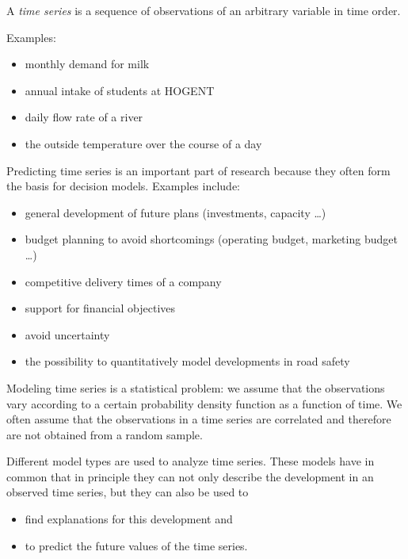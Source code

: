   \begin{definition}
    A \emph{time series} is a sequence of observations of an arbitrary variable in time order.
\end{definition}

Examples:

\begin{itemize}
	\item monthly demand for milk
	\item annual intake of students at HOGENT
	\item daily flow rate of a river
	\item the outside temperature over the course of a day
\end{itemize}

Predicting time series is an important part of research because they often form the basis for decision models. Examples include:

\begin{itemize}
	\item general development of future plans (investments, capacity \dots)
	\item budget planning to avoid shortcomings (operating budget, marketing budget \dots)
	\item competitive delivery times of a company
	\item support for financial objectives
	\item avoid uncertainty
	\item the possibility to quantitatively model developments in road safety
\end{itemize}


Modeling time series is a statistical problem: we assume that the observations vary according to a certain probability density function as a function of time. We often assume that the observations in a time series are correlated and therefore are not obtained from a random sample.

Different model types are used to analyze time series. These models have in common that in principle they can not only describe the development in an observed time series, but they can also be used to

\begin{itemize}
	\item find explanations for this development and
	\item to predict the future values of the time series.
\end{itemize}

